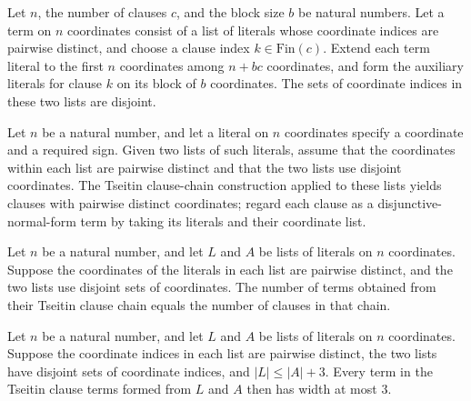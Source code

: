 \begin{theorem}
\label{FABL.disjoint_tseitinLiftLiterals_tseitinAuxiliaryLiterals}
\leanok
{}
Let $n$, the number of clauses $c$, and the block size $b$ be natural numbers. Let a
term on $n$ coordinates consist of a list of literals whose coordinate indices are
pairwise distinct, and choose a clause index $k\in\text{Fin}(c)$. Extend each term
literal to the first $n$ coordinates among $n+bc$ coordinates, and form the auxiliary
literals for clause $k$ on its block of $b$ coordinates. The sets of coordinate indices
in these two lists are disjoint.
\end{theorem}

\begin{definition}
\label{FABL.tseitinClauseTerms}
\leanok
{}
Let $n$ be a natural number, and let a literal on $n$ coordinates specify a coordinate
and a required sign. Given two lists of such literals, assume that the coordinates
within each list are pairwise distinct and that the two lists use disjoint coordinates.
The Tseitin clause-chain construction applied to these lists yields clauses with
pairwise distinct coordinates; regard each clause as a disjunctive-normal-form term by
taking its literals and their coordinate list.
\end{definition}

\begin{theorem}
\label{FABL.length_tseitinClauseTerms}
\leanok
{}
Let $n$ be a natural number, and let $L$ and $A$ be lists of literals on $n$
coordinates. Suppose the coordinates of the literals in each list are pairwise distinct,
and the two lists use disjoint sets of coordinates. The number of terms obtained from
their Tseitin clause chain equals the number of clauses in that chain.
\end{theorem}

\begin{theorem}
\label{FABL.width_le_three_of_mem_tseitinClauseTerms}
\leanok
{}
Let $n$ be a natural number, and let $L$ and $A$ be lists of literals on $n$
coordinates. Suppose the coordinate indices in each list are pairwise distinct, the two
lists have disjoint sets of coordinate indices, and $|L|\le |A|+3$. Every term in the
Tseitin clause terms formed from $L$ and $A$ then has width at most $3$.
\end{theorem}

